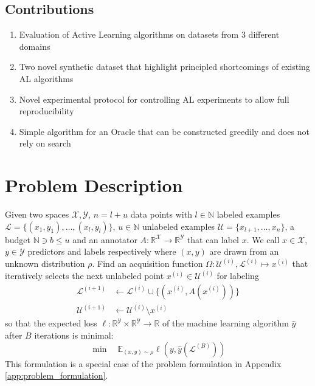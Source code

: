 \documentclass[]{article}
\newcommand{\U}{\mathcal{U}}
\newcommand{\LL}{\mathcal{L}}
\begin{document}
\subsection*{Contributions}
\begin{enumerate}
	\item Evaluation of Active Learning algorithms on datasets from 3 different domains
	\item Two novel synthetic dataset that highlight principled shortcomings of existing AL algorithms
	\item Novel experimental protocol for controlling AL experiments to allow full reproducibility
	\item Simple algorithm for an Oracle that can be constructed greedily and does not rely on search
\end{enumerate}


\section{Problem Description}
Given two spaces $\mathcal{X}, \mathcal{Y}$, $n=l+u$ data points with $l \in \mathbb{N}$ labeled examples $\mathcal{L} = \{(x_1, y_1),\ldots, (x_l,y_l)\}$, $u \in \mathbb{N}$ unlabeled examples $\mathcal{U} = \{x_{l+1},\ldots,x_{n}\}$, a budget $\mathbb{N} \ni b \le u$ and an annotator $A: \mathbb{R}^\mathcal{X} \to \mathbb{R}^\mathcal{Y}$ that can label $x$. 
We call $x \in \mathcal{X}$, $y \in \mathcal{Y}$ predictors and labels respectively where $(x,y)$ are drawn from an unknown distribution $\rho$. 
Find an acquisition function $\Omega: \U^{(i)},\LL^{(i)} \mapsto x^{(i)}$ that iteratively selects the next unlabeled point $x^{(i)} \in \U^{(i)}$ for labeling
\begin{align*}
	\LL^{(i+1)} &\gets \LL^{(i)} \cup \{\left(x^{(i)}, A(x^{(i)})\right)\} \\
	\U^{(i+1)} &\gets \U^{(i)} \setminus x^{(i)} %
\end{align*}
so that the expected loss $\ell: \mathbb{R}^\mathcal{Y} \times \mathbb{R}^\mathcal{Y} \to \mathbb{R}$ of the machine learning algorithm $\hat y$ after $B$ iterations is minimal: 
$$\min \quad \mathbb{E}_{(x,y) \sim \rho} \ell(y, \hat{y}(\LL^{(B)}))$$
This formulation is a special case of the problem formulation in Appendix \ref{app:problem_formulation}.

\newpage
\end{document}
